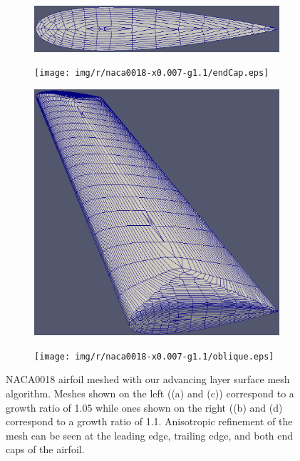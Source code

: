 \begin{figure}
	
	\centering
	
	\begin{subfigure}{0.4\textwidth}
		\centering
		\includegraphics[width = 0.9\linewidth, trim={0 7cm  0 7cm},clip]{img/r/naca0018-x0.007-g1.05/endCap.eps}
		\caption{}
		\label{fig-endCap-low}
	\end{subfigure}%
	\begin{subfigure}{0.4\textwidth}
		\centering
		\texttt{[image: img/r/naca0018-x0.007-g1.1/endCap.eps]}
		\caption{}
		\label{fig-endCap-high}
	\end{subfigure}
	
	\begin{subfigure}{0.4\textwidth}
		\centering
		\includegraphics[width=0.9\linewidth]{img/r/naca0018-x0.007-g1.05/oblique.eps}
		\caption{}
		\label{fig-oblique-low}
	\end{subfigure}%
	\begin{subfigure}{0.4\textwidth}
		\centering
		\texttt{[image: img/r/naca0018-x0.007-g1.1/oblique.eps]}
		\caption{}
		\label{fig-oblique-high}
	\end{subfigure}%
	\caption{NACA0018 airfoil meshed with our advancing layer surface mesh algorithm. Meshes shown on the left ((a) and (c)) correspond to a growth ratio of 1.05 while ones shown on the right ((b) and (d) correspond to a growth ratio of 1.1. Anisotropic refinement of the mesh can be seen at the leading edge, trailing edge, and both end caps of the airfoil.}
	\label{fig-naca}
\end{figure}

